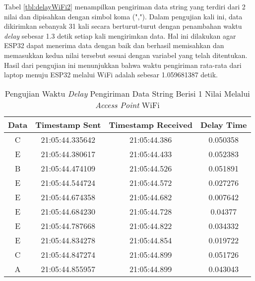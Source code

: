 Tabel \ref{tbl:delayWiFi2} menampilkan pengiriman data string yang terdiri dari 2 nilai dan dipisahkan dengan simbol koma (","). Dalam pengujian kali ini, data dikirimkan sebanyak 31 kali secara berturut-turut dengan penambahan waktu \emph{delay} sebesar 1.3 detik setiap kali mengirimkan data. Hal ini dilakukan agar ESP32 dapat menerima data dengan baik dan berhasil memisahkan dan memasukkan kedua nilai tersebut sesuai dengan variabel yang telah ditentukan. Hasil dari pengujian ini menunjukkan bahwa waktu pengiriman rata-rata dari laptop menuju ESP32 melalui WiFi adalah sebesar 1.059681387 detik.

\begin{longtable}{|ccc|c|}
  \caption{Pengujian Waktu \emph{Delay} Pengiriman Data String Berisi 1 Nilai Melalui \emph{Access Point} WiFi}
  \label{tbl:delayWiFi1}\\
    \hline
    \multicolumn{1}{|c|}{Data} & \multicolumn{1}{c|}{Timestamp Sent}  & Timestamp Received & Delay Time    \\ \hline
    \endfirsthead
    \endhead
    \multicolumn{1}{|c|}{C}    & \multicolumn{1}{c|}{21:05:44.335642} & 21:05:44.386       & 0.050358      \\ \hline
    \multicolumn{1}{|c|}{E}    & \multicolumn{1}{c|}{21:05:44.380617} & 21:05:44.433       & 0.052383      \\ \hline
    \multicolumn{1}{|c|}{B}    & \multicolumn{1}{c|}{21:05:44.474109} & 21:05:44.526       & 0.051891      \\ \hline
    \multicolumn{1}{|c|}{E}    & \multicolumn{1}{c|}{21:05:44.544724} & 21:05:44.572       & 0.027276      \\ \hline
    \multicolumn{1}{|c|}{E}    & \multicolumn{1}{c|}{21:05:44.674358} & 21:05:44.682       & 0.007642      \\ \hline
    \multicolumn{1}{|c|}{E}    & \multicolumn{1}{c|}{21:05:44.684230} & 21:05:44.728       & 0.04377       \\ \hline
    \multicolumn{1}{|c|}{E}    & \multicolumn{1}{c|}{21:05:44.787668} & 21:05:44.822       & 0.034332      \\ \hline
    \multicolumn{1}{|c|}{E}    & \multicolumn{1}{c|}{21:05:44.834278} & 21:05:44.854       & 0.019722      \\ \hline
    \multicolumn{1}{|c|}{C}    & \multicolumn{1}{c|}{21:05:44.847274} & 21:05:44.899       & 0.051726      \\ \hline
    \multicolumn{1}{|c|}{A}    & \multicolumn{1}{c|}{21:05:44.855957} & 21:05:44.899       & 0.043043      \\ \hline

\end{longtable}
